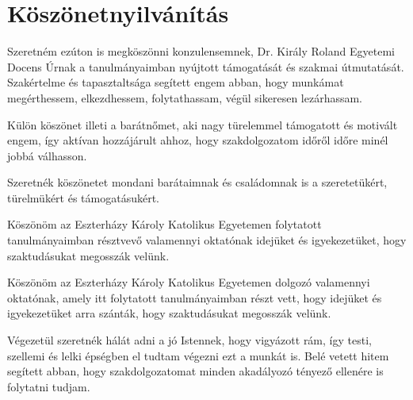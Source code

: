 \documentclass[tocnopagenum]{thesis-ekf}
\begin{document}
	\section{Köszönetnyilvánítás}
	Szeretném ezúton is megköszönni konzulensemnek, Dr. Király Roland Egyetemi Docens Úrnak a tanulmányaimban nyújtott támogatását és szakmai útmutatását. Szakértelme és tapasztaltsága segített engem abban, hogy munkámat megérthessem, elkezdhessem, folytathassam, végül sikeresen lezárhassam.
	
	Külön köszönet illeti a barátnőmet, aki nagy türelemmel támogatott és motivált engem, így aktívan hozzájárult ahhoz, hogy szakdolgozatom időről időre minél jobbá válhasson.
	
	Szeretnék köszönetet mondani barátaimnak és családomnak is a szeretetükért, türelmükért és támogatásukért.
	
	Köszönöm az Eszterházy Károly Katolikus Egyetemen folytatott tanulmányaimban résztvevő valamennyi oktatónak idejüket és igyekezetüket, hogy szaktudásukat megosszák velünk.
	
	Köszönöm az Eszterházy Károly Katolikus Egyetemen dolgozó valamennyi oktatónak, amely itt folytatott tanulmányaimban részt vett, hogy idejüket és igyekezetüket arra szánták, hogy szaktudásukat megosszák velünk. 
		
	Végezetül szeretnék hálát adni a jó Istennek, hogy vigyázott rám, így testi, szellemi és lelki épségben el tudtam végezni ezt a munkát is. Belé vetett hitem segített abban, hogy szakdolgozatomat minden akadályozó tényező ellenére is folytatni tudjam.
	
	
	\listoffigures
	
\end{document}
